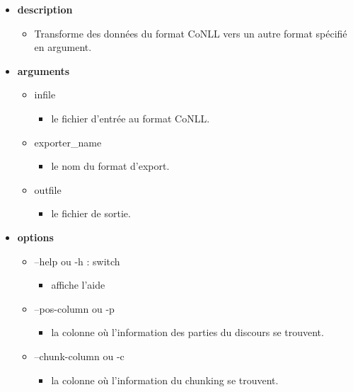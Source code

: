 \documentclass[manual-fr.tex]{subfiles}
\begin{document}
\begin{itemize}
    \item[] \textbf{description}
        \begin{itemize}
            \item[] Transforme des données du format CoNLL vers un autre format spécifié en argument.
        \end{itemize}
    \item[] \textbf{arguments}
        \begin{itemize}
            \item[] infile
                \begin{itemize}
                    \item[] le fichier d'entrée au format CoNLL.
                \end{itemize}
            \item[] exporter\_name
                \begin{itemize}
                    \item[] le nom du format d'export.
                \end{itemize}
            \item[] outfile
                \begin{itemize}
                    \item[] le fichier de sortie.
                \end{itemize}
        \end{itemize}
    \item[] \textbf{options}
        \begin{itemize}
            \item[] --help ou -h : switch
                \begin{itemize}
                    \item[] affiche l'aide
                \end{itemize}
            \item[] --pos-column ou -p
                \begin{itemize}
                    \item[] la colonne où l'information des parties du discours se trouvent.
                \end{itemize}
            \item[] --chunk-column ou -c
                \begin{itemize}
                    \item[] la colonne où l'information du chunking se trouvent.
                \end{itemize}

\end{itemize}
\end{itemize}
\end{document}

